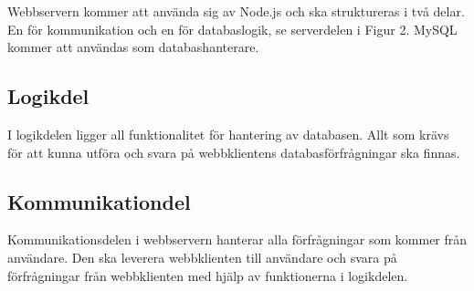 \documentclass[a4paper,10pt]{article}
\begin{document}
Webbservern kommer att använda sig av Node.js och ska struktureras i två delar. En för kommunikation och en för databaslogik, se serverdelen i Figur 2. MySQL kommer att användas som databashanterare.

\subsection{Logikdel}
I logikdelen ligger all funktionalitet för hantering av databasen. Allt som krävs för att kunna utföra och svara på webbklientens databasförfrågningar ska finnas.

\subsection{Kommunikationdel}
Kommunikationsdelen i webbservern hanterar alla förfrågningar som kommer från användare. Den ska leverera webbklienten till användare och svara på förfrågningar från webbklienten med hjälp av funktionerna i logikdelen.



\end{document}

